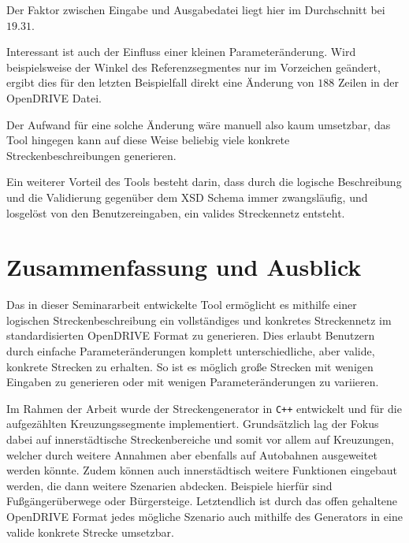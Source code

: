 Der Faktor zwischen Eingabe und Ausgabedatei liegt hier im Durchschnitt bei \(19.31\).

Interessant ist auch der Einfluss einer kleinen Parameteränderung. Wird beispielsweise der Winkel des Referenzsegmentes nur im Vorzeichen geändert, ergibt dies für den letzten Beispielfall direkt eine Änderung von \(188\) Zeilen in der OpenDRIVE Datei.

Der Aufwand für eine solche Änderung wäre manuell also kaum umsetzbar, das Tool hingegen kann auf diese Weise beliebig viele konkrete Streckenbeschreibungen generieren.

Ein weiterer Vorteil des Tools besteht darin, dass durch die logische Beschreibung und die Validierung gegenüber dem XSD Schema immer zwangsläufig, und losgelöst von den Benutzereingaben, ein valides Streckennetz entsteht.

\chapter{Zusammenfassung und Ausblick}

Das in dieser Seminararbeit entwickelte Tool ermöglicht es mithilfe einer logischen Streckenbeschreibung ein vollständiges und konkretes Streckennetz im standardisierten OpenDRIVE Format zu generieren. Dies erlaubt Benutzern durch einfache Parameteränderungen komplett unterschiedliche, aber valide, konkrete Strecken zu erhalten. So ist es möglich große Strecken mit wenigen Eingaben zu generieren oder mit wenigen Parameteränderungen zu variieren.

Im Rahmen der Arbeit wurde der Streckengenerator in \texttt{C++} entwickelt und für die aufgezählten Kreuzungssegmente implementiert. Grundsätzlich lag der Fokus dabei auf innerstädtische Streckenbereiche und somit vor allem auf Kreuzungen, welcher durch weitere Annahmen aber ebenfalls auf Autobahnen ausgeweitet werden könnte. Zudem können auch innerstädtisch weitere Funktionen eingebaut werden, die dann weitere Szenarien abdecken. Beispiele hierfür sind Fußgängerüberwege oder Bürgersteige. Letztendlich ist durch das offen gehaltene OpenDRIVE Format jedes mögliche Szenario auch mithilfe des Generators in eine valide konkrete Strecke umsetzbar.